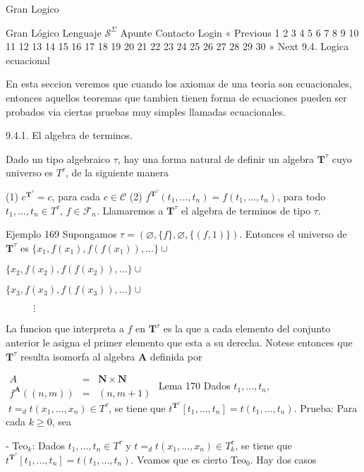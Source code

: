 Gran Logico

Gran Lógico
Lenguaje \(\mathcal{S}^{\Sigma }\)
Apunte
Contacto
Login
« Previous
1
2
3
4
5
6
7
8
9
10
11
12
13
14
15
16
17
18
19
20
21
22
23
24
25
26
27
28
29
30
» Next
9.4. Logica ecuacional

En esta seccion veremos que cuando los axiomas de una teoria son ecuacionales, entonces aquellos teoremas que tambien tienen forma de ecuaciones pueden ser probados via ciertas pruebas muy simples llamadas ecuacionales.

9.4.1. El algebra de terminos.

Dado un tipo algebraico \(\tau \), hay una forma natural de definir un algebra \(\mathbf{T}^{\tau }\) cuyo universo es \(T^{\tau }\), de la siguiente manera

(1) \(c^{\mathbf{T}^{\tau }}=c\), para cada \(c\in \mathcal{C}\)
(2) \(f^{\mathbf{T}^{\tau }}(t_{1},...,t_{n})=f(t_{1},...,t_{n})\), para todo \(t_{1},...,t_{n}\in T^{\tau }\), \(f\in \mathcal{F}_{n}\).
Llamaremos a \(\mathbf{T}^{\tau }\) el algebra de terminos de tipo \(\tau \).

Ejemplo 169 Supongamos \(\tau =(\varnothing ,\{f\},\varnothing ,\{(f,1)\}).\) Entonces el universo de \(\mathbf{T}^{\tau }\) es
\(\{x_{1},f(x_{1}),f(f(x_{1})),...\}\cup \)

\(\{x_{2},f(x_{2}),f(f(x_{2})),...\}\cup \)

\(\{x_{3},f(x_{3}),f(f(x_{3})),...\}\cup \)

\(\;\;\;\;\;\;\;\;\;\;\vdots \)

La funcion que interpreta a \(f\) en \(\mathbf{T}^{\tau }\) es la que a cada elemento del conjunto anterior le asigna el primer elemento que esta a su derecha. Notese entonces que \(\mathbf{T}^{\tau }\) resulta isomorfa al algebra \(\mathbf{A}\) definida por

\(\displaystyle \begin{array}{rcl} A & =& \mathbf{N}\times \mathbf{N} \\ f^{\mathbf{A}}((n,m)) & =& (n,m+1) \end{array} \)
Lema 170 Dados \(t_{1},...,t_{n}\),\(\;t=_{d}t(x_{1},...,x_{n})\in T^{\tau }\), se tiene que \(t^{\mathbf{T}^{\tau }}[t_{1},...,t_{n}]=t(t_{1},...,t_{n})\).
Prueba: Para cada \(k\geq 0\), sea

- Teo\(_{k}\): Dados \(t_{1},...,t_{n}\in T^{\tau }\) y \( t=_{d}t(x_{1},...,x_{n})\in T_{k}^{\tau }\), se tiene que \(t^{\mathbf{T} ^{\tau }}[t_{1},...,t_{n}]=t(t_{1},...,t_{n})\).
Veamos que es cierto Teo\(_{0}\). Hay dos casos

